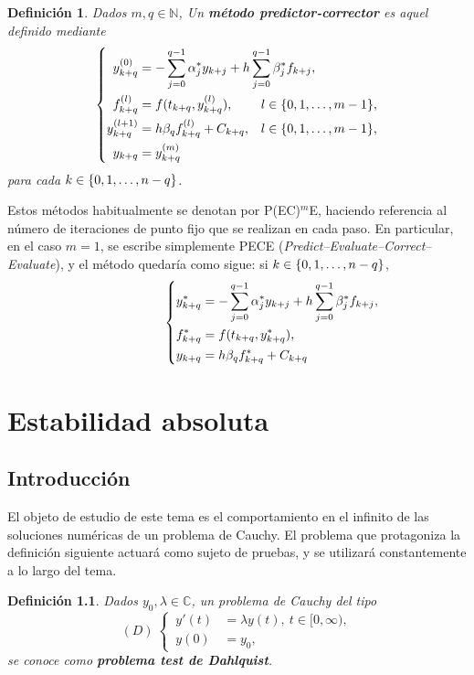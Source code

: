 \documentclass[11pt]{report}
\theoremstyle{mytheorem}
\theoremstyle{mydefinition}
\newtheorem{definition}{Definición}
\theoremstyle{myexample}
\newenvironment{cdefinition} %
  {\begin{mdframed}[
        linewidth=3pt,
        linecolor=c1,
        bottomline=false,
        topline=false,
        rightline=false,
        innerrightmargin=0pt,
        innertopmargin=0pt,
        innerbottommargin=0pt,
        innerleftmargin=1em, %
        skipabove=\baselineskip]
    \begin{definition}}
  {\end{definition}\end{mdframed}}
\newcommand{\N}{\mathbb N}
\newcommand{\C}{\mathbb C}
\newcommand{\mybf}[1]{\boldmath\textbf{\color{c1}#1}\unboldmath}
\begin{document}
\begin{cdefinition}
Dados $m,q \in \N$, Un \mybf{método predictor-corrector} es aquel definido mediante
\[\left\{\begin{alignedat}{2}
y_{k+q}^{(0)} &=\mathrlap{-\sum_{j=0}^{q-1} \alpha_j^* y_{k+j} + h\sum_{j=0}^{q-1} \beta_j^* f_{k+j},} \\
f_{k+q}^{(l)}&=f(t_{k+q},y_{k+q}^{(l)}), \quad & l \in \{0,1,\mathellipsis,m-1\},\\
y_{k+q}^{(l+1)}&= h\beta_qf_{k+q}^{(l)}+C_{k+q}, \quad & l \in \{0,1,\mathellipsis,m-1\}, \\
    y_{k+q} &= y_{k+q}^{(m)} \\
\end{alignedat}\right.\]
para cada $k \in \{0,1,\mathellipsis,n-q\}$.
\end{cdefinition}

Estos métodos habitualmente se denotan por P(EC)$^m$E, haciendo referencia al número de iteraciones de punto fijo que se realizan en cada paso. En particular, en el caso $m = 1$, se escribe simplemente PECE (\emph{Predict–Evaluate–Correct–Evaluate}), y el método quedaría como sigue: si  $k \in \{0,1,\mathellipsis,n-q\}$,
\[\left\{\begin{alignedat}{2}
y_{k+q}^* &=\mathrlap{-\sum_{j=0}^{q-1} \alpha_j^* y_{k+j} + h\sum_{j=0}^{q-1} \beta_j^* f_{k+j},} \\
f_{k+q}^*&=f(t_{k+q},y_{k+q}^*),\\
y_{k+q}&= h\beta_qf_{k+q}^*+C_{k+q} \\
\end{alignedat}\right.\]

\chapter{Estabilidad absoluta}

\section{Introducción}

El objeto de estudio de este tema es el comportamiento en el infinito de las soluciones numéricas de un problema de Cauchy. El problema que protagoniza la definición siguiente actuará como sujeto de pruebas, y se utilizará constantemente a lo largo del tema.

\begin{cdefinition}
    Dados $y_0,\lambda \in \C$, un problema de Cauchy del tipo
    \[(D) \ \left\{
    \begin{alignedat}{1}
    \, y'(t)  &= \lambda y(t), \ t \in [0,\infty), \\
    \, y(0) &= y_0,
    \end{alignedat}\right.\]
    se conoce como \mybf{problema test de Dahlquist}.
\end{cdefinition}
\end{document}
